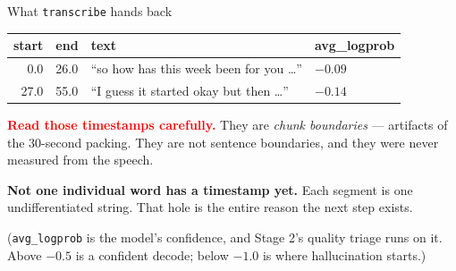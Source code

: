 \documentclass[aspectratio=169]{beamer}
\begin{document}
\begin{frame}{What \texttt{transcribe} hands back}

\begin{center}
\small
\begin{tabular}{rlll}
\toprule
\textbf{start} & \textbf{end} & \textbf{text} & \textbf{avg\_logprob} \\
\midrule
0.0 & 26.0 & ``so how has this week been for you \dots'' & $-0.09$ \\
27.0 & 55.0 & ``I guess it started okay but then \dots'' & $-0.14$ \\
\bottomrule
\end{tabular}
\end{center}

\vspace{0.8em}
\textcolor{red}{\textbf{Read those timestamps carefully.}} They are \emph{chunk boundaries}
--- artifacts of the 30-second packing. They are not sentence boundaries, and they were
never measured from the speech.

\vspace{0.5em}
\textbf{Not one individual word has a timestamp yet.} Each segment is one undifferentiated
string. That hole is the entire reason the next step exists.

\vspace{0.3em}
{\small(\texttt{avg\_logprob} is the model's confidence, and Stage 2's quality triage runs on
it. Above $-0.5$ is a confident decode; below $-1.0$ is where hallucination starts.)}

\end{frame}
\end{document}
